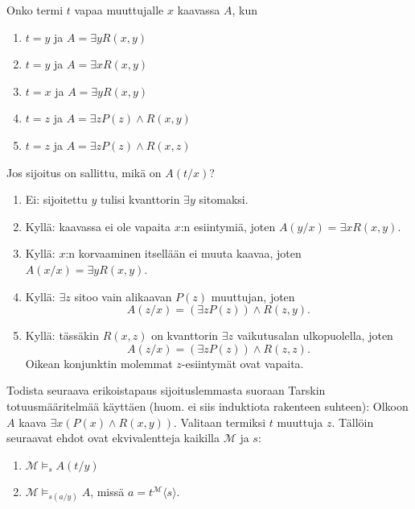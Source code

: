 \documentclass[11pt,a4paper]{amsart}
\begin{document}
\begin{exercise}
  Onko termi \(t\) vapaa muuttujalle \(x\) kaavassa \(A\), kun
  \leavevmode\par
  \begin{enumerate}[label=(\alph*)]
    \item \(t = y\) ja \(A = \exists yR(x,y)\)
    \item \(t = y\) ja \(A = \exists xR(x,y)\)
    \item \(t = x\) ja \(A = \exists yR(x,y)\)
    \item \(t = z\) ja \(A = \exists zP(z) \land R(x,y)\)
    \item \(t = z\) ja \(A = \exists zP(z) \land R(x,z)\)
  \end{enumerate}
  Jos sijoitus on sallittu, mikä on \(A(t/x)\)?
\end{exercise}

\begin{solution}
  \leavevmode\par
  \begin{enumerate}[label=(\alph*)]
    \item Ei: sijoitettu \(y\) tulisi kvanttorin \(\exists y\) sitomaksi.
    \item Kyllä: kaavassa ei ole vapaita \(x\):n esiintymiä, joten
      \(A(y/x)=\exists xR(x,y)\).
    \item Kyllä: \(x\):n korvaaminen itsellään ei muuta kaavaa, joten
      \(A(x/x)=\exists yR(x,y)\).
    \item Kyllä: \(\exists z\) sitoo vain alikaavan \(P(z)\)
      muuttujan, joten
      \[
        A(z/x)=(\exists zP(z))\land R(z,y).
      \]
    \item Kyllä: tässäkin \(R(x,z)\) on kvanttorin \(\exists z\)
      vaikutusalan ulkopuolella, joten
      \[
        A(z/x)=(\exists zP(z))\land R(z,z).
      \]
      Oikean konjunktin molemmat \(z\)-esiintymät ovat vapaita.
  \end{enumerate}
\end{solution}

\begin{exercise}
  Todista seuraava erikoistapaus sijoituslemmasta suoraan Tarskin
  totuusmääritelmää käyttäen (huom. ei siis induktiota rakenteen suhteen):
  Olkoon \(A\) kaava \(\exists x(P(x) \land R(x,y))\). Valitaan termiksi
  \(t\) muuttuja \(z\). Tällöin seuraavat ehdot ovat ekvivalentteja kaikilla
  \(\mathcal M\) ja \(s\):
  \leavevmode\par
  \begin{enumerate}[label=(\alph*)]
    \item \(\mathcal M \models_s A(t/y)\)
    \item \(\mathcal M \models_{s(a/y)} A\), missä
      \(a = t^{\mathcal M}\langle s\rangle\).
  \end{enumerate}
\end{exercise}
\end{document}
